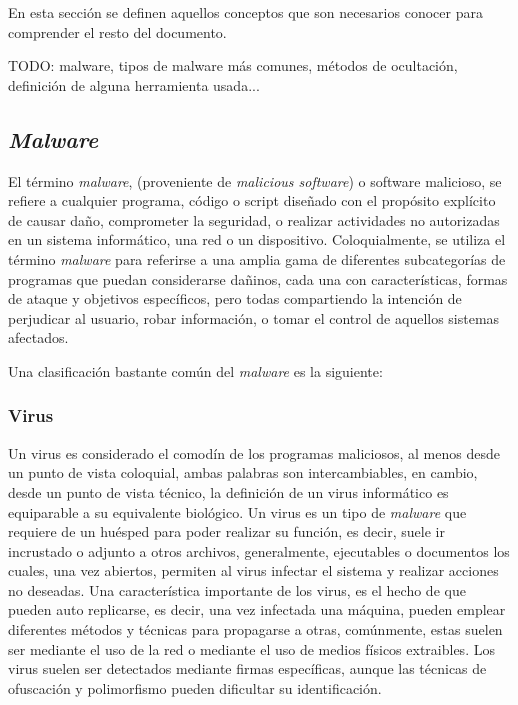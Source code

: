 
En esta sección se definen aquellos conceptos que son necesarios conocer para comprender el resto del documento.

TODO: malware, tipos de malware más comunes, métodos de ocultación, definición de alguna herramienta usada...

\subsection{\textit{Malware}}
El término \textit{malware}, (proveniente de \textit{malicious software}) o software malicioso, se refiere a cualquier programa, código o script diseñado con el propósito explícito de causar daño, comprometer la seguridad, o realizar actividades no autorizadas en un sistema informático, una red o un dispositivo. Coloquialmente, se utiliza el término \textit{malware} para referirse a una amplia gama de diferentes subcategorías de programas que puedan considerarse dañinos, cada una con características, formas de ataque y objetivos específicos, pero todas compartiendo la intención de perjudicar al usuario, robar información, o tomar el control de aquellos sistemas afectados.

Una clasificación bastante común del \textit{malware} es la siguiente:

\subsubsection{Virus}
Un virus es considerado el comodín de los programas maliciosos, al menos desde un punto de vista coloquial, ambas palabras son intercambiables, en cambio, desde un punto de vista técnico, la definición de un virus informático es equiparable a su equivalente biológico. Un virus es un tipo de \textit{malware} que requiere de un huésped para poder realizar su función, es decir, suele ir incrustado o adjunto a otros archivos, generalmente, ejecutables o documentos los cuales, una vez abiertos, permiten al virus infectar el sistema y realizar acciones no deseadas. Una característica importante de los virus, es el hecho de que pueden auto replicarse, es decir, una vez infectada una máquina, pueden emplear diferentes métodos y técnicas para propagarse a otras, comúnmente, estas suelen ser mediante el uso de la red o mediante el uso de medios físicos extraibles. Los virus suelen ser detectados mediante firmas específicas, aunque las técnicas de ofuscación y polimorfismo pueden dificultar su identificación.

